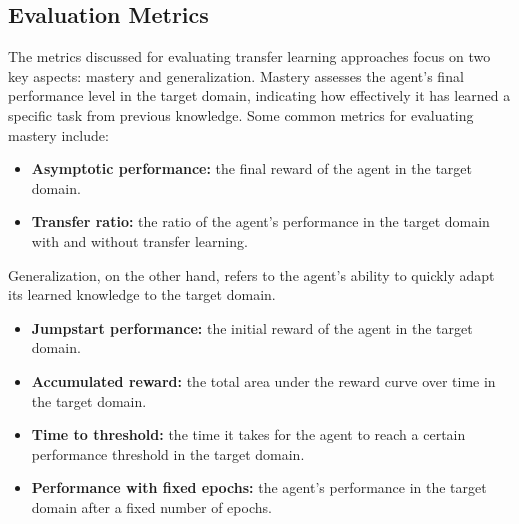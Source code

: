 \subsection{Evaluation Metrics}
The metrics discussed for evaluating transfer learning approaches focus on two key aspects: mastery and generalization. 
Mastery assesses the agent's final performance level in the target domain, indicating how effectively it has learned a specific task from previous knowledge. 
Some common metrics for evaluating mastery include:
\begin{itemize}
    \item \textbf{Asymptotic performance:} the final reward of the agent in the target domain.
    \item \textbf{Transfer ratio:} the ratio of the agent's performance in the target domain with and without transfer learning.
\end{itemize}
Generalization, on the other hand, refers to the agent's ability to quickly adapt its learned knowledge to the target domain.
\begin{itemize}
    \item \textbf{Jumpstart performance:} the initial reward of the agent in the target domain.
    \item \textbf{Accumulated reward:} the total area under the reward curve over time in the target domain.
    \item \textbf{Time to threshold:} the time it takes for the agent to reach a certain performance threshold in the target domain.
    \item \textbf{Performance with fixed epochs:} the agent's performance in the target domain after a fixed number of epochs.
\end{itemize}

